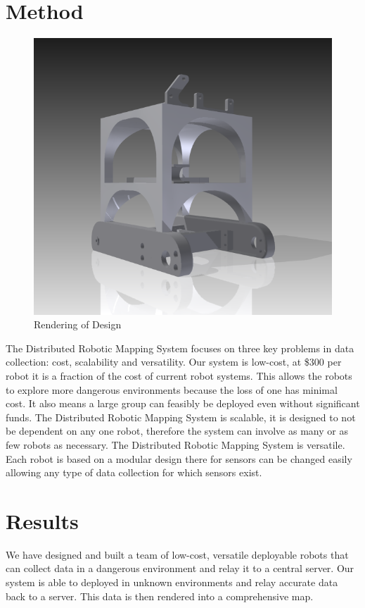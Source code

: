 \documentclass[10pt,letterpaper]{article}
\begin{document}
	\section{Method}
	\begin{figure}
		\centering
		\includegraphics[width=.47\textwidth]{ApolloRender}
		\caption*{Rendering of Design}
	\end{figure}
		
	The Distributed Robotic Mapping System focuses on three key problems in data collection: cost, scalability and versatility. Our system is low-cost, at \$300 per robot it is a fraction of the cost of	current robot systems. This allows the robots to explore more dangerous environments because the loss of one has minimal cost. It also means a large group can feasibly be deployed even without significant funds. The Distributed Robotic Mapping System is scalable, it is	designed to not be dependent on any one robot, therefore the system can involve as many or as few robots as necessary. The Distributed Robotic Mapping System is versatile. Each robot is	based on a modular design there for sensors can be changed easily allowing any type of data collection for which sensors exist.
	
	\section{Results}
	We have designed and built a team of low-cost, versatile deployable robots that can collect data in a dangerous environment and relay it to a central server. Our system is able to deployed in unknown environments and relay accurate data back to a server. This data is then rendered into a comprehensive map.
	
\end{document}
